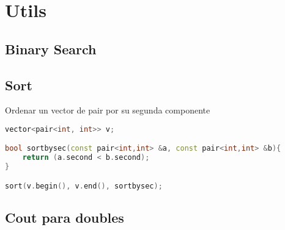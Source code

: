 \section{Utils}

\subsection{Binary Search}


\subsection{Sort}
Ordenar un vector de pair por su segunda componente
\begin{lstlisting}[language=C++]
vector<pair<int, int>> v;

bool sortbysec(const pair<int,int> &a, const pair<int,int> &b){
	return (a.second < b.second);
}

sort(v.begin(), v.end(), sortbysec);
\end{lstlisting}
\subsection{Cout para doubles}

\newpage
